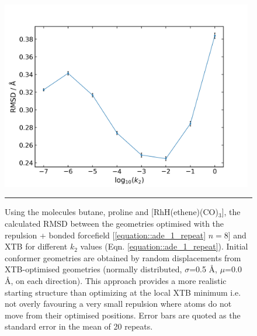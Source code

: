 \documentclass[../../main.tex]{subfiles}
\begin{document}
\begin{figure}[h!]
	\vspace{0.4cm}
	\centering
	\includegraphics[width=11cm]{5/autode/figs/figS3}
	\vspace{0.4cm}
	\hrule
	\caption{Using the molecules butane, proline and [RhH(ethene)(CO)${}_3$], the calculated RMSD between the geometries optimised with the repulsion + bonded forcefield [\eqref{equation::ade_1_repeat} $n=8$] and XTB for different $k_2$ values (Eqn. \eqref{equation::ade_1_repeat}). Initial conformer geometries are obtained by random displacements from XTB-optimised geometries (normally distributed, $\sigma$=0.5 \AA, $\mu$=0.0 \AA, on each direction). This approach provides a more realistic starting structure than optimizing at the local XTB minimum i.e. not overly favouring a very small repulsion where atoms do not move from their optimised positions. Error bars are quoted as the standard error in the mean of 20 repeats.}
	\label{fig::ade_si_3}
\end{figure}
\end{document}
